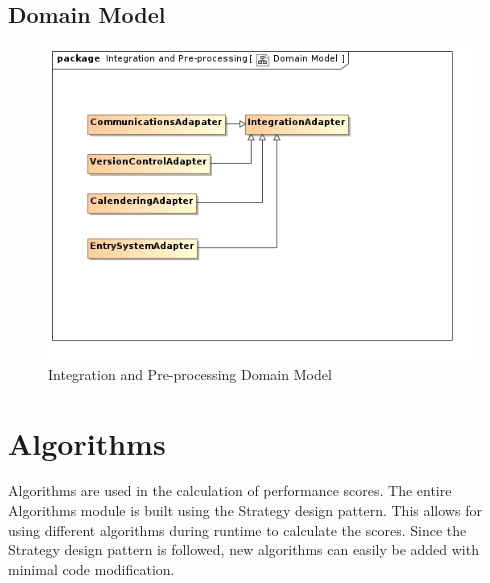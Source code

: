 \documentclass[11pt,a4paper]{article}
\begin{document}
\subsection{Domain Model}
\begin{figure}[H]
	\begin{center}
		\includegraphics[scale=0.75]{../Images/Integration Domain Model.jpg}
		\caption{Integration and Pre-processing Domain Model}
	\end{center}
\end{figure}

\pagebreak

\section{Algorithms}

Algorithms are used in the calculation of performance scores. The entire Algorithms module is built using the Strategy design pattern. This allows for using different algorithms during runtime to calculate the scores. Since the Strategy design pattern is followed, new algorithms can easily be added with minimal code modification.
\end{document}
